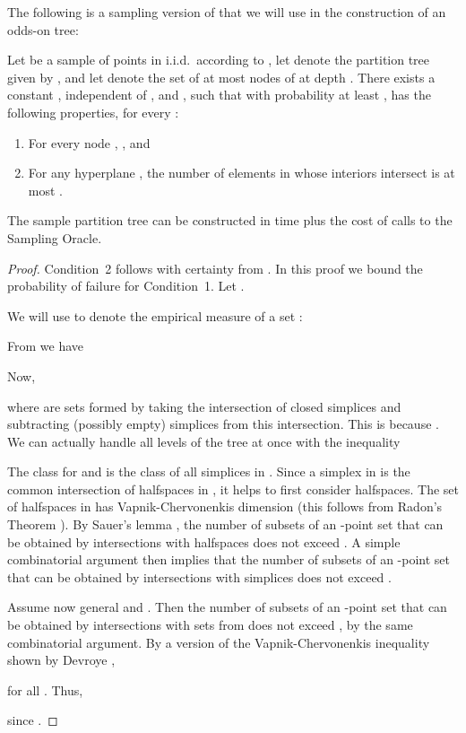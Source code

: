 \documentclass{patmorin}
\begin{document}
The following is a sampling version of  that we
will use in the construction of an odds-on tree:

\begin{thm} 
  Let  be a sample of  points in  i.i.d.\ according
  to , let  denote the partition tree
  given by , and let  denote the set
  of at most  nodes of  at depth .  There exists a constant ,
  independent of ,  and , such that with probability at least
  ,  has the following properties, for every
  :
  \begin{enumerate}
    \item For every node , ,
         and
    \item For any hyperplane , the number of elements in
       whose interiors intersect  is at most
      .
  \end{enumerate}
  The sample partition tree  can be constructed in 
  time plus the cost of  calls to the Sampling Oracle.
\end{thm}

\def\isdef{\buildrel {\rm def} \over =}
\def\PROB{\Pr}

\begin{proof}
  Condition~2 follows with certainty from .
  In this proof we bound the probability of failure for Condition~1.
  Let .

  We will use  to denote the empirical measure of a set
  :
    
  From  we have
  
  Now,
  
  where  are sets formed by taking the intersection of 
  closed simplices and subtracting   (possibly empty) simplices
  from this intersection.  This is because .
  We can actually handle all levels  of the tree
  at once with the inequality
  
  The class  for  and  is the class of all
  simplices in .   Since a simplex in  is the common
  intersection of  halfspaces in , it helps to first consider
  halfspaces.  The set of halfspaces in  has Vapnik-Chervonenkis
  dimension  (this follows from Radon's Theorem \cite{e93}).
  By Sauer's lemma \cite{s72}\cite[pages~28--29]{dl01}, the number of
  subsets of an -point set that can be obtained by intersections
  with halfspaces does not exceed .  A simple combinatorial
  argument then implies that the number of subsets of an -point set
  that can be obtained by intersections with simplices does not exceed
  .

  Assume now general  and . Then the number of subsets of an
  -point set that can be obtained by intersections with sets from
   does not exceed , by the same
  combinatorial argument.  By a version of the Vapnik-Chervonenkis
  inequality \cite{vc71} shown by Devroye \cite{d82},
  
  for all .
  Thus, 
  
  since .
\end{proof}
\end{document}
